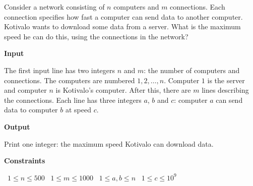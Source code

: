 Consider a network consisting of $n$ computers and $m$ connections. Each connection specifies how fast a computer can send data to another computer.
Kotivalo wants to download some data from a server. What is the maximum speed he can do this, using the connections in the network?

\vspace{0.3cm}\noindent\textbf{Input}

The first input line has two integers $n$ and $m$: the number of computers and connections. The computers are numbered $1,2,\dots,n$. Computer $1$ is the server and computer $n$ is Kotivalo's computer.
After this, there are $m$ lines describing the connections. Each line has three integers $a$, $b$ and $c$: computer $a$ can send data to computer $b$ at speed $c$.

\vspace{0.3cm}\noindent\textbf{Output}

Print one integer: the maximum speed Kotivalo can download data.

\vspace{0.3cm}\noindent\textbf{Constraints}

\textbullet\ $1 \le n \le 500$
\textbullet\ $1 \le m \le 1000$
\textbullet\ $1 \le a,b \le n$
\textbullet\ $1 \le c \le 10^9$